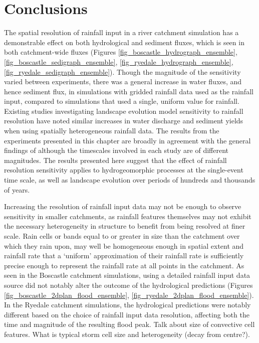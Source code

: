 \chapter{Conclusions}
\label{chapter_conclusion}

The spatial resolution of rainfall input in a river catchment simulation has a demonstrable effect on both hydrological and sediment fluxes, which is seen in both catchment-wide fluxes (Figures \ref{fig_boscastle_hydrograph_ensemble}, \ref{fig_boscastle_sedigraph_ensemble}, \ref{fig_ryedale_hydrograph_ensemble}, \ref{fig_ryedale_sedigraph_ensemble}). Though the magnitude of the sensitivity varied between experiments, there was a general increase in water fluxes, and hence sediment flux, in simulations with gridded rainfall data used as the rainfall input, compared to simulations that used a single, uniform value for rainfall. Existing studies investigating landscape evolution model sensitivity to rainfall resolution \citep{coulthard2016sensitivity} have noted similar increases in water discharge and sediment yields when using spatially heterogeneous rainfall data. The results from the experiments presented in this chapter are broadly in agreement with the general findings of \citet{coulthard2016sensitivity} although the timescales involved in each study are of different magnitudes. The results presented here suggest that the effect of rainfall resolution sensitivity applies to hydrogeomorphic processes at the single-event time scale, as well as landscape evolution over periods of hundreds and thousands of years.

Increasing the resolution of rainfall input data may not be enough to observe sensitivity in smaller catchments, as rainfall features themselves may not exhibit the necessary heterogeneity in structure to benefit from being resolved at finer scale. Rain cells or bands equal to or greater in size than the catchment over which they rain upon, may well be homogeneous enough in spatial extent and rainfall rate that a `uniform' approximation of their rainfall rate is sufficiently precise enough to represent the rainfall rate at all points in the catchment. As seen in the Boscastle catchment simulations, using a detailed rainfall input data source did not notably alter the outcome of the hydrological predictions (Figures \ref{fig_boscastle_2dplan_flood_ensemble}, \ref{fig_ryedale_2dplan_flood_ensemble}). In the Ryedale catchment simulations, the hydrological predictions were notably different based on the choice of rainfall input data resolution, affecting both the time and magnitude of the resulting flood peak. 
%
Talk about size of convective cell features. What is typical storm cell size and heterogeneity (decay from centre?).
